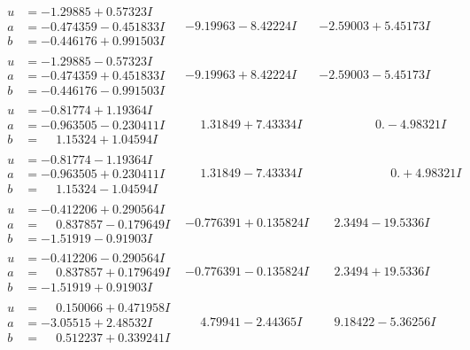 \documentclass[1p]{elsarticle_modified}
\theoremstyle{definition}
\begin{document}
$$\begin{array}{c|c|c}
\begin{aligned}
u &= -1.29885 + 0.57323 I \\
a &= -0.474359 - 0.451833 I \\
b &= -0.446176 + 0.991503 I\end{aligned}
 & -9.19963 - 8.42224 I & -2.59003 + 5.45173 I \\ \hline\begin{aligned}
u &= -1.29885 - 0.57323 I \\
a &= -0.474359 + 0.451833 I \\
b &= -0.446176 - 0.991503 I\end{aligned}
 & -9.19963 + 8.42224 I & -2.59003 - 5.45173 I \\ \hline\begin{aligned}
u &= -0.81774 + 1.19364 I \\
a &= -0.963505 - 0.230411 I \\
b &= \phantom{-}1.15324 + 1.04594 I\end{aligned}
 & \phantom{-}1.31849 + 7.43334 I & \phantom{-0.000000 } 0. - 4.98321 I \\ \hline\begin{aligned}
u &= -0.81774 - 1.19364 I \\
a &= -0.963505 + 0.230411 I \\
b &= \phantom{-}1.15324 - 1.04594 I\end{aligned}
 & \phantom{-}1.31849 - 7.43334 I & \phantom{-0.000000 -}0. + 4.98321 I \\ \hline\begin{aligned}
u &= -0.412206 + 0.290564 I \\
a &= \phantom{-}0.837857 - 0.179649 I \\
b &= -1.51919 - 0.91903 I\end{aligned}
 & -0.776391 + 0.135824 I & \phantom{-}2.3494 - 19.5336 I \\ \hline\begin{aligned}
u &= -0.412206 - 0.290564 I \\
a &= \phantom{-}0.837857 + 0.179649 I \\
b &= -1.51919 + 0.91903 I\end{aligned}
 & -0.776391 - 0.135824 I & \phantom{-}2.3494 + 19.5336 I \\ \hline\begin{aligned}
u &= \phantom{-}0.150066 + 0.471958 I \\
a &= -3.05515 + 2.48532 I \\
b &= \phantom{-}0.512237 + 0.339241 I\end{aligned}
 & \phantom{-}4.79941 - 2.44365 I & \phantom{-}9.18422 - 5.36256 I \\ \hline\begin{aligned}

\end{aligned}
\end{array}$$
\end{document}
